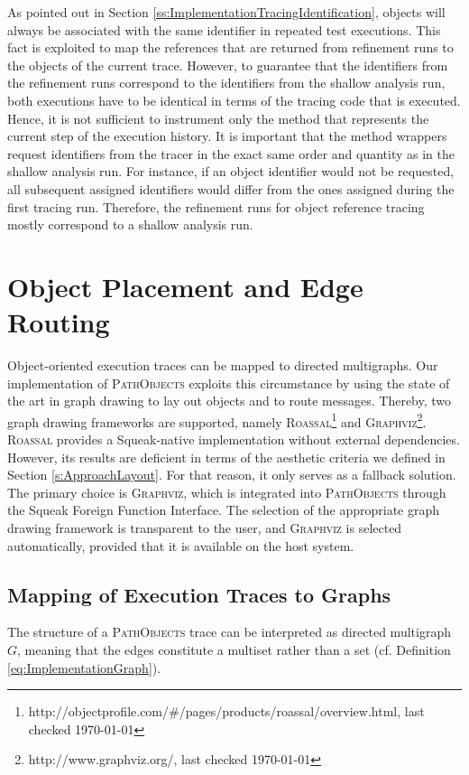 As pointed out in Section \ref{ss:ImplementationTracingIdentification}, objects will always be associated with the same identifier in repeated test executions.
This fact is exploited to map the references that are returned from refinement runs to the objects of the current trace.
However, to guarantee that the identifiers from the refinement runs correspond to the identifiers from the shallow analysis run, both executions have to be identical in terms of the tracing code that is executed.
Hence, it is not sufficient to instrument only the method that represents the current step of the execution history.
It is important that the method wrappers request identifiers from the tracer in the exact same order and quantity as in the shallow analysis run.
For instance, if an object identifier would not be requested, all subsequent assigned identifiers would differ from the ones assigned during the first tracing run.
Therefore, the refinement runs for object reference tracing mostly correspond to a shallow analysis run.

\section[Object Placement and Edge Routing]{Object Placement and Edge Routing%
}
\label{s:ImplementationLayouting}
Object-oriented execution traces can be mapped to directed multigraphs.
Our implementation of \textsc{PathObjects} exploits this circumstance by using the state of the art in graph drawing to lay out objects and to route messages.
Thereby, two graph drawing frameworks are supported, namely \textsc{Roassal}\footnote{http://objectprofile.com/\#/pages/products/roassal/overview.html, last checked \today} and \textsc{Graphviz}\footnote{http://www.graphviz.org/, last checked \today}.
\textsc{Roassal} provides a Squeak-native implementation without external dependencies.
However, its results are deficient in terms of the aesthetic criteria we defined in Section \ref{s:ApproachLayout}.
For that reason, it only serves as a fallback solution.
The primary choice is \textsc{Graphviz}, which is integrated into \textsc{PathObjects} through the Squeak Foreign Function Interface.
The selection of the appropriate graph drawing framework is transparent to the user, and  \textsc{Graphviz} is selected automatically, provided that it is available on the host system.

\subsection{Mapping of Execution Traces to Graphs}
The structure of a \textsc{PathObjects} trace can be interpreted as directed multigraph $G$, meaning that the edges constitute a multiset rather than a set (cf. Definition \ref{eq:ImplementationGraph}).

